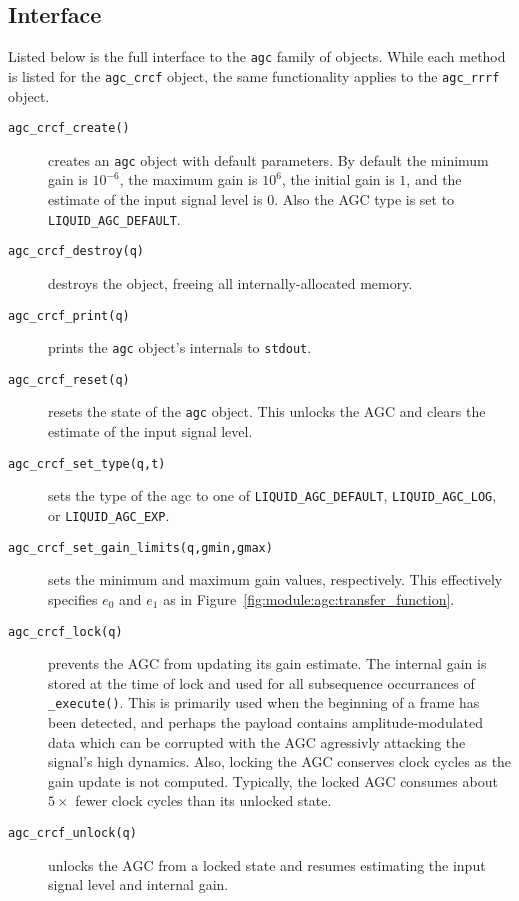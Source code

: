\subsection{Interface}
\label{module:agc:squelch:interface}
Listed below is the full interface to the {\tt agc} family of objects.
While each method is listed for the {\tt agc\_crcf} object, the same
functionality applies to the {\tt agc\_rrrf} object.
\begin{description}
\item[{\tt agc\_crcf\_create()}]
    creates an {\tt agc} object with default parameters.
    By default the minimum gain is $10^{-6}$, the maximum gain is $10^6$, the
    initial gain is $1$, and the estimate of the input signal level is $0$.
    Also the AGC type is set to {\tt LIQUID\_AGC\_DEFAULT}.
\item[{\tt agc\_crcf\_destroy(q)}]
    destroys the object, freeing all internally-allocated memory.
\item[{\tt agc\_crcf\_print(q)}]
    prints the {\tt agc} object's internals to {\tt stdout}.
\item[{\tt agc\_crcf\_reset(q)}]
    resets the state of the {\tt agc} object.
    This unlocks the AGC and clears the estimate of the input signal level.
\item[{\tt agc\_crcf\_set\_type(q,t)}]
    sets the type of the agc to one of
    {\tt LIQUID\_AGC\_DEFAULT},
    {\tt LIQUID\_AGC\_LOG}, or
    {\tt LIQUID\_AGC\_EXP}.
\item[{\tt agc\_crcf\_set\_gain\_limits(q,gmin,gmax)}]
    sets the minimum and maximum gain values, respectively.
    This effectively specifies $e_0$ and $e_1$ as in
    Figure~\ref{fig:module:agc:transfer_function}.
\item[{\tt agc\_crcf\_lock(q)}]
    prevents the AGC from updating its gain estimate.
    The internal gain is stored at the time of lock and used for all
    subsequence occurrances of {\tt \_execute()}.
    This is primarily used when the beginning of a frame has been detected,
    and perhaps the payload contains amplitude-modulated data which can be
    corrupted with the AGC agressivly attacking the signal's high
    dynamics.
    Also, locking the AGC conserves clock cycles as the gain update is
    not computed.
    Typically, the locked AGC consumes about $5\times$ fewer clock
    cycles than its unlocked state.
\item[{\tt agc\_crcf\_unlock(q)}]
    unlocks the AGC from a locked state and resumes estimating the input
    signal level and internal gain.

\end{description}
